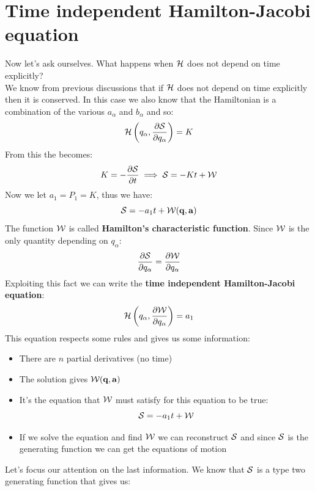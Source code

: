 \section{Time independent Hamilton-Jacobi equation}
Now let's ask ourselves. What happens when $\mathcal{H}$ does not depend on time explicitly?\\
We know from previous discussions that if $\mathcal{H}$ does not depend on time explicitly then it is conserved. In this case we also know that the Hamiltonian is a combination of the various $a_{\alpha}$ and $b_{\alpha}$ and so:
\begin{equation}
  \hamfun \brackets{q_{\alpha}, \pdv{\action}{q_{\alpha}}} = K
\end{equation}
From this the \hamjacref\;becomes:
\begin{equation}
  K = -\pdv{\action}{t} \implies \action = -Kt + \hamch
\end{equation}
Now we let $a_1 = P_1 = K$, thus we have:
\begin{equation}
  \mathcal{S} = -a_1t + \mathcal{W}(\vb{q},\vb{a})
\end{equation}
The function $\mathcal{W}$ is called \textbf{Hamilton's characteristic function}. Since $\mathcal{W}$ is the only quantity depending on $q_{\alpha}$:
\begin{equation}
  \pdv{\action}{q_{\alpha}} = \pdv{\hamch}{q_{\alpha}}
\end{equation}
Exploiting this fact we can write the \textbf{time independent Hamilton-Jacobi equation}:
\begin{equation}
  \hamfun \brackets{q_{\alpha},\pdv{\hamch}{q_{\alpha}}} = a_1
\end{equation}
This equation respects some rules and gives us some information:
\begin{itemize}
  \item There are $n$ partial derivatives (no time)
  \item The solution gives $\mathcal{W}(\vb{q},\vb{a})$
  \item It's the equation that $\mathcal{W}$ must satisfy for this equation to be true:
  \begin{equation}
    \mathcal{S} = -a_1t + \mathcal{W}
  \end{equation}
  \item If we solve the equation and find $\mathcal{W}$ we can reconstruct $\mathcal{S}$ and since $\mathcal{S}$ is the generating function we can get the equations of motion
\end{itemize}
Let's focus our attention on the last information. We know that $\mathcal{S}$ is a type two generating function that gives us:
